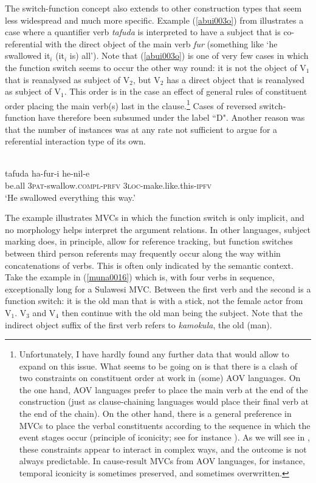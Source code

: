 The switch-function concept also extends to other construction types that seem less widespread and much more specific. Example (\ref{abui003o}) from  illustrates a case where a quantifier verb \textit{tafuda} is interpreted to have a subject that is co-referential with the direct object of the main verb \textit{fur} (something like `he swallowed it$_i$ (it$_i$ is) all'). Note that (\ref{abui003o}) is one of very few cases in which the function switch seems to occur the other way round: it is not the object of V$_1$ that is reanalysed as subject of V$_2$, but V$_2$ has a direct object that is reanalysed as subject of V$_1$. This order is in the  case an effect of general rules of constituent order placing the main verb(s) last in the clause.\footnote{Unfortunately, I have hardly found any further data that would allow to expand on this issue. What seems to be going on is that there is a clash of two constraints on constituent order at work in (some) AOV languages. On the one hand, AOV languages prefer to place the main verb at the end of the construction (just as clause-chaining languages would place their final verb at the end of the chain). On the other hand, there is a general preference in MVCs to place the verbal constituents according to the sequence in which the event stages occur (principle of iconicity; see for instance \citealt{vanstaden2008serial}). As we will see in , these constraints appear to interact in complex ways, and the outcome is not always predictable. In cause-result MVCs from AOV languages, for instance, temporal iconicity is sometimes preserved, and sometimes overwritten.} Cases of reversed switch-function have therefore been subsumed under the label ``D". Another reason was that the number of instances was at any rate not sufficient to argue for a referential interaction type of its own.

\ea \label{abui003o}
\\
\gll tafuda ha-fur-i he-nil-e \\
be.all 3\textsc{pat}-swallow.\textsc{compl}-\textsc{prfv} 3\textsc{loc}-make.like.this-\textsc{ipfv} \\
\glft `He swallowed everything this way.’\\ 
\z

The  example illustrates MVCs in which the function switch is only implicit, and no morphology helps interpret the argument relations. In other languages, subject marking does, in principle, allow for reference tracking, but function switches between third person referents may frequently occur along the way within concatenations of verbs. This is often only indicated by the semantic context. Take the  example in (\ref{muna0016}) which is, with four verbs in sequence, exceptionally long for a Sulawesi MVC. Between the first verb and the second is a function switch: it is the old man that is with a stick, not the female actor from V$_1$. V$_3$ and V$_4$ then continue with the old man being the subject. Note that the indirect object suffix of the first verb refers to \textit{kamokula}, the old (man).

